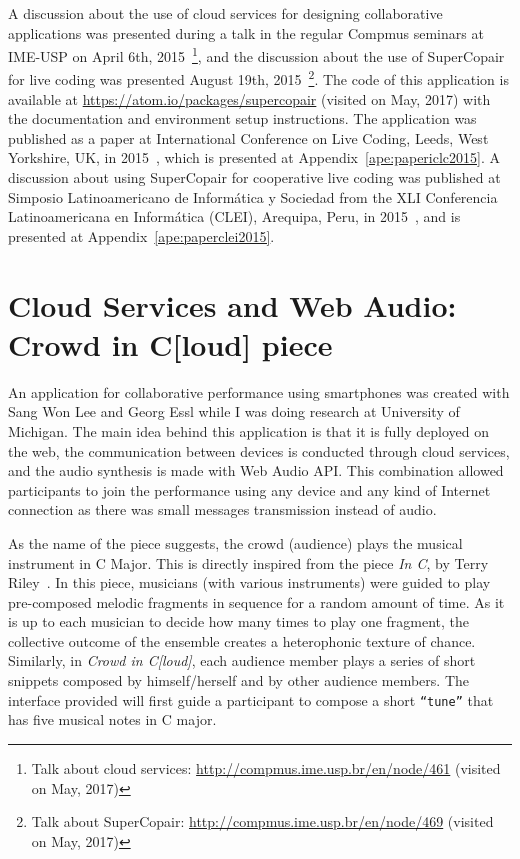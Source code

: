 A discussion about the use of cloud services for designing collaborative applications was presented during a talk in the regular Compmus seminars at IME-USP on April 6th, 2015~\footnote{Talk about cloud services: \url{http://compmus.ime.usp.br/en/node/461} (visited on May, 2017)}, and the discussion about the use of SuperCopair for live coding was presented August 19th, 2015~\footnote{Talk about SuperCopair: \url{http://compmus.ime.usp.br/en/node/469} (visited on May, 2017)}.
The code of this application is available at \url{https://atom.io/packages/supercopair} (visited on May, 2017) with the documentation and environment setup instructions.
The application was published as a paper at International Conference on Live Coding, Leeds, West Yorkshire, UK, in 2015~\citep{deCarvalhoJunior2015supercopair}, which is presented at Appendix~\ref{ape:papericlc2015}.
A discussion about using SuperCopair for cooperative live coding was published at Simposio Latinoamericano de Informática y Sociedad from the XLI Conferencia Latinoamericana en Informática (CLEI), Arequipa, Peru, in 2015~\citep{deCarvalhoJunior2015cooperative}, and is presented at Appendix~\ref{ape:paperclei2015}.

\section{Cloud Services and Web Audio: Crowd in C[loud] piece}
\label{apesec:appcrowdincloud}

An application for collaborative performance using smartphones was created with Sang Won Lee and Georg Essl while I was doing research at University of Michigan.
The main idea behind this application is that it is fully deployed on the web, the communication between devices is conducted through cloud services, and the audio synthesis is made with Web Audio API.
This combination allowed participants to join the performance using any device and any kind of Internet connection as there was small messages transmission instead of audio.

As the name of the piece suggests, the crowd (audience) plays the musical instrument in C Major. 
This is directly inspired from the piece \textit{In C}, by Terry Riley~\citep{Riley1964inc}. 
In this piece, musicians (with various instruments) were guided to play pre-composed melodic fragments in sequence for a random amount of time. 
As it is up to each musician to decide how many times to play one fragment, the collective outcome of the ensemble creates a heterophonic texture of chance.
Similarly, in \textit{Crowd in C[loud]}, each audience member plays a series of short snippets composed by himself/herself and by other audience members.
The interface provided will first guide a participant to compose a short \texttt{``tune''} that has five musical notes in C major.

